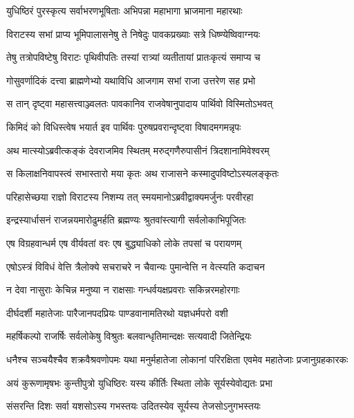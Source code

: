 \twolineshloka
{युधिष्ठिरं पुरस्कृत्य सर्वाभरणभूषिताः}
{अभिपन्ना महाभागा भ्राजमाना महारथाः}


\twolineshloka
{विराटस्य सभां प्राप्य भूमिपालासनेषु ते}
{निषेदुः पावकप्रख्याः सत्रे धिष्ण्येष्विवाग्नयः}


\twolineshloka
{तेषु तत्रोपविष्टेषु विराटः पृथिवीपतिः}
{तस्यां रात्र्यां व्यतीतायां प्रातःकृत्यं समाप्य च}


\twolineshloka
{गोसुवर्णादिकं दत्त्वा ब्राह्मणेभ्यो यथाविधि}
{आजगाम सभां राजा उत्तरेण सह प्रभो}


\twolineshloka
{स तान् दृष्ट्वा महासत्त्वाञ्ज्वलतः पावकानिव}
{राजवेषानुपादाय पार्थिवो विस्मितोऽभवत्}



\twolineshloka
{किमिदं को विधिस्त्वेष भयार्त इव पार्थिवः}
{पुरुषप्रवरान्दृष्ट्वा विषादमगमन्नृपः}


\twolineshloka
{अथ मात्स्योऽब्रवीत्कङ्कं देवराजमिव स्थितम्}
{मरुद्गणैरुपासीनं त्रिदशानामिवेश्वरम्}


\twolineshloka
{स किलाक्षनिवापस्त्वं सभास्तारो मया कृतः}
{अथ राजासने कस्मादुपविष्टोऽस्यलङ्कृतः}



\twolineshloka
{परिहासेच्छया राज्ञो विराटस्य निशम्य तत्}
{स्मयमानोऽब्रवीद्वाक्यमर्जुनः परवीरहा}


\twolineshloka
{इन्द्रस्यार्धासनं राजन्नयमारोढुमर्हति}
{ब्रह्मण्यः श्रुतवांस्त्यागी सर्वलोकाभिपूजितः}


\twolineshloka
{एष विग्रहवान्धर्म एष वीर्यवतां वरः}
{एष बुद्ध्याधिको लोके तपसां च परायणम्}


\twolineshloka
{एषोऽस्त्रं विविधं वेत्ति त्रैलोक्ये सचराचरे}
{न चैवान्यः पुमान्वेत्ति न वेत्स्यति कदाचन}


\twolineshloka
{न देवा नासुराः केचिन्न मनुष्या न राक्षसाः}
{गन्धर्वयक्षप्रवराः सकिन्नरमहोरगाः}


\twolineshloka
{दीर्घदर्शी महातेजाः पारैजानपदप्रियः}
{पाण्डवानामतिरथो यज्ञधर्मपरो वशी}


\twolineshloka
{महर्षिकल्पो राजर्षिः सर्वलोकेषु विश्रुतः}
{बलवान्धृतिमान्दक्षः सत्यवादी जितेन्द्रियः}


\threelineshloka
{धनैश्च सञ्चयैश्चैव शक्रवैश्रवणोपमः}
{यथा मनुर्महातेजा लोकानां परिरक्षिता}
{एवमेव महातेजाः प्रजानुग्रहकारकः}


\twolineshloka
{अयं कुरूणामृषभः कुन्तीपुत्रो युधिष्ठिरः}
{यस्य कीर्तिः स्थिता लोके सूर्यस्येवोद्यतः प्रभा}


\twolineshloka
{संसरन्ति दिशः सर्वा यशसोऽस्य गभस्तयः}
{उदितस्येव सूर्यस्य तेजसोऽनुगभस्तयः}


